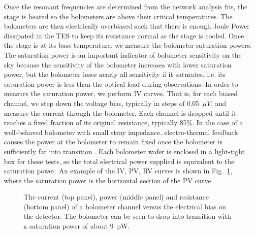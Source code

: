 \documentclass[../EBEXPaper2.tex]{subfiles}
\begin{document}
Once the resonant frequencies are determined from the network analysis fits, the stage is heated so the bolometers are above their critical temperatures. 
The bolometers are then electrically overbiased such that there is enough Joule Power dissipated in the \ac{TES} to keep its resistance normal as the stage is cooled. 
Once the stage is at its base temperature, we measure the bolometer saturation powers. 
The saturation power is an important indicator of bolometer sensitivity on the sky because the sensitivity of the bolometer increases with lower saturation power, but the bolometer loses nearly all sensitivity if it saturates, i.e. its saturation power is less than the optical load during observations. 
In order to measure the saturation power, we perform IV curves. 
That is, for each biased channel, we step down the voltage bias, typically in steps of 0.05~$\mu V$, and measure the current through the bolometer. 
Each channel is dropped until it reaches a fixed fraction of its original resistance, typically 85\%.
In the case of a well-behaved bolometer with small stray impedance, electro-thermal feedback causes the power at the bolometer to remain fixed once the bolometer is sufficiently far into transition \cite{lanting_thesis}.
Each bolometer wafer is enclosed in a light-tight box for these tests, so the total electrical power supplied is equivalent to the saturation power. 
An example of the IV, PV, RV curves is shown in Fig.~\ref{fig:bolo_iv_curve}, where the saturation power is the horizontal section of the PV curve.

\begin{figure}[htbp]
\begin{center}
\caption{The current (top panel), power (middle panel) and resistance (bottom panel) of a bolometer channel versus the electrical bias on the detector. The bolometer can be seen to drop into transition with a saturation power of about 9~pW.    }
\label{fig:bolo_iv_curve}
\end{center}
\end{figure}
\end{document}
